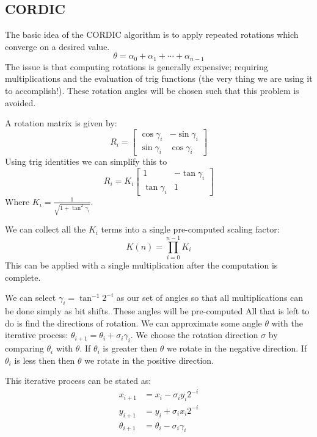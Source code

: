     \subsection{CORDIC} 
        The basic idea of the CORDIC\cite{V:1959} algorithm is to apply repeated rotations which converge on a desired value.
        \[ \theta = \alpha_0 + \alpha_1 + \dotsb + \alpha_{n-1} \]
        The issue is that computing rotations is generally expensive;
        requiring multiplications and the evaluation of trig functions (the very thing we are using it to accomplish!).
        These rotation angles will be chosen such that this problem is avoided.

        A rotation matrix is given by:
        \[
          R_i = \begin{bmatrix}
            \cos\gamma_i & -\sin\gamma_i \\
            \sin\gamma_i & \cos\gamma_i
          \end{bmatrix}
        \]
        Using trig identities we can simplify this to 
        \[
          R_i = K_i
                \begin{bmatrix}
                  1            & -\tan\gamma_i \\
                  \tan\gamma_i & 1 
                \end{bmatrix}
        \]
        Where $K_i = \frac{1}{\sqrt{1+\tan^2\gamma_i}}$.

        We can collect all the $K_i$ terms into a single pre-computed scaling factor:
        \[ K(n) = \prod_{i=0}^{n-1}K_i \] 
        This can be applied with a single multiplication after the computation is complete.

        We can select $\gamma_i = \tan^{-1}2^{-i}$ as our set of angles so that all multiplications can be done simply as bit shifts. 
        These angles will be pre-computed 
        All that is left to do is find the directions of rotation.
        We can approximate some angle $\theta$ with the iterative process: $\theta_{i+1} = \theta_i + \sigma_i\gamma_i$.
        We choose the rotation direction $\sigma$ by comparing $\theta_i$ with $\theta$.
        If $\theta_i$ is greater then $\theta$ we rotate in the negative direction.
        If $\theta_i$ is less then then $\theta$ we rotate in the positive direction.

        This iterative process can be stated as:
        \begin{equation}\label{eq:cordIter}
            \begin{aligned}        
                x_{i+1}      &= x_i - \sigma_iy_i2^{-i}\\
                y_{i+1}      &= y_i + \sigma_ix_i2^{-i}\\
                \theta_{i+1} &= \theta_i - \sigma_i\gamma_i
            \end{aligned}
        \end{equation}

